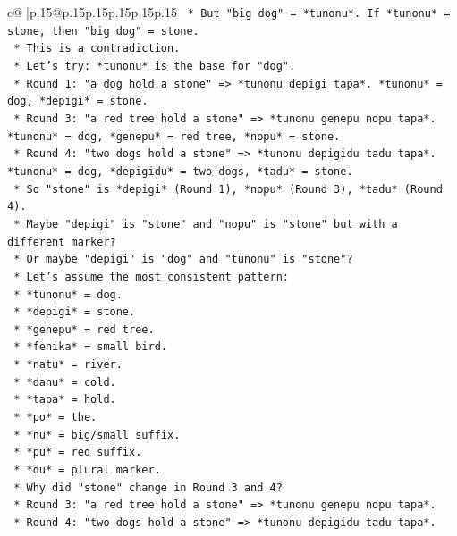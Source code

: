 \documentclass{article}
\begin{document}
{\begin{supertabular}{c@{$\;$}|p{.15\linewidth}@{}p{.15\linewidth}p{.15\linewidth}p{.15\linewidth}p{.15\linewidth}p{.15\linewidth}}
{{{\texttt{        *   But "big dog" = *tunonu*. If *tunonu* = stone, then "big dog" = stone.} \\
\texttt{        *   This is a contradiction.} \\
\texttt{        *   Let's try: *tunonu* is the base for "dog".} \\
\texttt{        *   Round 1: "a dog hold a stone" => *tunonu depigi tapa*. *tunonu* = dog, *depigi* = stone.} \\
\texttt{        *   Round 3: "a red tree hold a stone" => *tunonu genepu nopu tapa*. *tunonu* = dog, *genepu* = red tree, *nopu* = stone.} \\
\texttt{        *   Round 4: "two dogs hold a stone" => *tunonu depigidu tadu tapa*. *tunonu* = dog, *depigidu* = two dogs, *tadu* = stone.} \\
\texttt{        *   So "stone" is *depigi* (Round 1), *nopu* (Round 3), *tadu* (Round 4).} \\
\texttt{        *   Maybe "depigi" is "stone" and "nopu" is "stone" but with a different marker?} \\
\texttt{        *   Or maybe "depigi" is "dog" and "tunonu" is "stone"?} \\
\texttt{        *   Let's assume the most consistent pattern:} \\
\texttt{        *   *tunonu* = dog.} \\
\texttt{        *   *depigi* = stone.} \\
\texttt{        *   *genepu* = red tree.} \\
\texttt{        *   *fenika* = small bird.} \\
\texttt{        *   *natu* = river.} \\
\texttt{        *   *danu* = cold.} \\
\texttt{        *   *tapa* = hold.} \\
\texttt{        *   *po* = the.} \\
\texttt{        *   *nu* = big/small suffix.} \\
\texttt{        *   *pu* = red suffix.} \\
\texttt{        *   *du* = plural marker.} \\
\texttt{        *   Why did "stone" change in Round 3 and 4?} \\
\texttt{        *   Round 3: "a red tree hold a stone" => *tunonu genepu nopu tapa*.} \\
\texttt{        *   Round 4: "two dogs hold a stone" => *tunonu depigidu tadu tapa*.} \\
}}}
\end{supertabular}}
\end{document}

